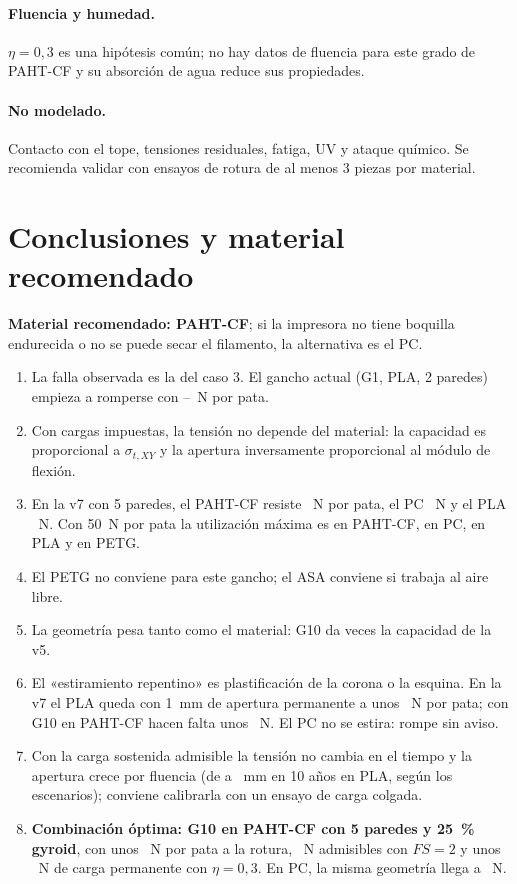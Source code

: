 \documentclass[11pt,a4paper]{article}
\begin{document}
\paragraph{Fluencia y humedad.} $\eta=0{,}3$ es una hipótesis común; no hay datos de fluencia para este grado de PAHT-CF y su absorción de agua reduce sus propiedades.
\paragraph{No modelado.} Contacto con el tope, tensiones residuales, fatiga, UV y ataque químico. Se recomienda validar con ensayos de rotura de al menos 3 piezas por material.

\section{Conclusiones y material recomendado}
\textbf{Material recomendado: PAHT-CF}; si la impresora no tiene boquilla endurecida o no se puede secar el filamento, la alternativa es el PC.
\begin{enumerate}
\item La falla observada es la del caso 3. El gancho actual (G1, PLA, 2 paredes) empieza a romperse con \FuFivePLAlo--\FuFivePLAhi~N por pata.
\item Con cargas impuestas, la tensión no depende del material: la capacidad es proporcional a $\sigma_{t,XY}$ y la apertura inversamente proporcional al módulo de flexión.
\item En la v7 con 5 paredes, el PAHT-CF resiste \FuPAHT~N por pata, el PC \FuPC~N y el PLA \FuPLA~N. Con 50~N por pata la utilización máxima es \UPAHTseven{} en PAHT-CF, \UPCseven{} en PC, \UPLAseven{} en PLA y \UPETGseven{} en PETG.
\item El PETG no conviene para este gancho; el ASA conviene si trabaja al aire libre.
\item La geometría pesa tanto como el material: G10 da \GtenVsGone{} veces la capacidad de la v5.
\item El «estiramiento repentino» es plastificación de la corona o la esquina. En la v7 el PLA queda con 1~mm de apertura permanente a unos \NLoffPLAsix~N por pata; con G10 en PAHT-CF hacen falta unos \NLoffPAHTten~N. El PC no se estira: rompe sin aviso.
\item Con la carga sostenida admisible la tensión no cambia en el tiempo y la apertura crece por fluencia (de \CrPLAzero{} a \CrPLAten~mm en 10 años en PLA, según los escenarios); conviene calibrarla con un ensayo de carga colgada.
\item \textbf{Combinación óptima: G10 en PAHT-CF con 5 paredes y 25~\% gyroid}, con unos \FuTenPAHT~N por pata a la rotura, \FuTenPAHTadm~N admisibles con $FS=2$ y unos \FuTenPAHTsost~N de carga permanente con $\eta=0{,}3$. En PC, la misma geometría llega a \FuTenPC~N.
\end{enumerate}
\end{document}
